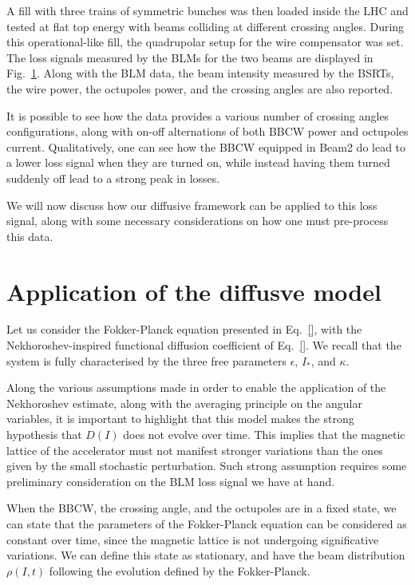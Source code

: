 A fill with three trains of symmetric bunches was then loaded inside the LHC and tested at flat top energy with beams colliding at different crossing angles. During this operational-like fill, the quadrupolar setup for the wire compensator was set. The loss signals measured by the BLMs for the two beams are displayed in Fig.~\ref{fig:wire-data}. Along with the BLM data, the beam intensity measured by the BSRTs, the wire power, the octupoles power, and the crossing angles are also reported. 

\begin{figure}
    \centering
    \caption{}
    \label{fig:wire-data}
\end{figure}

It is possible to see how the data provides a various number of crossing angles configurations, along with on-off alternations of both BBCW power and octupoles current. Qualitatively, one can see how the BBCW equipped in Beam2 do lead to a lower loss signal when they are turned on, while instead having them turned suddenly off lead to a strong peak in losses.

We will now discuss how our diffusive framework can be applied to this loss signal, along with some necessary considerations on how one must pre-process this data. 

\section{Application of the diffusve model}

Let us consider the Fokker-Planck equation presented in Eq.~\eqref{}, with the Nekhoroshev-inspired functional diffusion coefficient of Eq.~\eqref{}. We recall that the system is fully characterised by the three free parameters $\epsilon$, $I_\ast$, and $\kappa$.

Along the various assumptions made in order to enable the application of the Nekhoroshev estimate, along with the averaging principle on the angular variables, it is important to highlight that this model makes the strong hypothesis that $D(I)$ does not evolve over time. This implies that the magnetic lattice of the accelerator must not manifest stronger variations than the ones given by the small stochastic perturbation. Such strong assumption requires some preliminary consideration on the BLM loss signal we have at hand.

When the BBCW, the crossing angle, and the octupoles are in a fixed state, we can state that the parameters of the Fokker-Planck equation can be considered as constant over time, since the magnetic lattice is not undergoing significative variations. We can define this state as stationary, and have the beam distribution $\rho(I, t)$ following the evolution defined by the Fokker-Planck.

